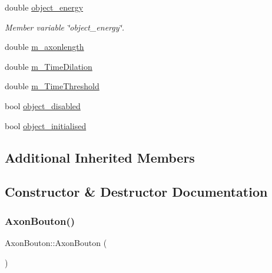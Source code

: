 \begin{DoxyCompactItemize}
double \mbox{\hyperlink{classAxonBouton_a4878e6a13e75b8473dfb3bb79637fe3a}{object\+\_\+energy}}
\begin{DoxyCompactList}\small\item\em Member variable \char`\"{}object\+\_\+energy\char`\"{}. \end{DoxyCompactList}\item 
double \mbox{\hyperlink{classAxonBouton_a9ac7a8e73e5f84db791a69d47863d684}{m\+\_\+axonlength}}
\item 
double \mbox{\hyperlink{classAxonBouton_ab83ac3e3436bd4080ef5f118ee6c57b4}{m\+\_\+\+Time\+Dilation}}
\item 
double \mbox{\hyperlink{classAxonBouton_aaef78a821ff347809f9bcd3787c6de15}{m\+\_\+\+Time\+Threshold}}
\item 
bool \mbox{\hyperlink{classAxonBouton_a6760cc2afc8f7a42401d82979b2ac9bc}{object\+\_\+disabled}}
\item 
bool \mbox{\hyperlink{classAxonBouton_a2d8bfbb162110b78489d059fb90e5cf3}{object\+\_\+initialised}}
\end{DoxyCompactItemize}
\subsection*{Additional Inherited Members}


\subsection{Constructor \& Destructor Documentation}
\mbox{\label{classAxonBouton_acd6521d65ecb2b86abf2e3a8b322699e}} 
\subsubsection{\texorpdfstring{Axon\+Bouton()}{AxonBouton()}\hspace{0.1cm}{\footnotesize\ttfamily [1/4]}}
{\footnotesize\ttfamily Axon\+Bouton\+::\+Axon\+Bouton (\begin{DoxyParamCaption}{ }\end{DoxyParamCaption})\hspace{0.3cm}{\ttfamily [inline]}}

\mbox{\label{classAxonBouton_a8a2da76b259a5ebab397fbd89d8b0632}} 
